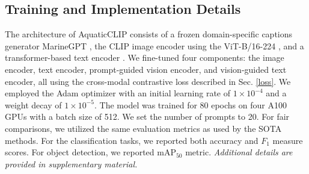 \subsection{Training and Implementation Details}
The architecture of AquaticCLIP consists of a frozen domain-specific captions generator MarineGPT \cite{zheng2023marinegpt}, the CLIP \cite{radford2021learning} image encoder using the ViT-B/16-224 \cite{dosovitskiy2020image}, and a transformer-based text encoder \cite{radford2019language}. 
We fine-tuned four components: the image encoder, text encoder, prompt-guided vision encoder, and vision-guided text encoder, all using the cross-modal contrastive loss described in Sec. \ref{loss}.
We employed the Adam optimizer \cite{loshchilov2017decoupled} with an initial learning rate of $1 \times 10^{-4}$ and a weight decay of $1 \times 10^{-5}$.
The model was trained for 80 epochs on four A100 GPUs with a batch size of 512. 
We set the number of prompts to 20. 
For fair comparisons, we utilized the same evaluation metrics as used by the SOTA methods.
For the classification tasks, we reported both accuracy and $F_{1}$ measure scores. 
For object detection, we reported mAP$_{50}$ metric.
\textit{Additional details are provided in supplementary material.}
